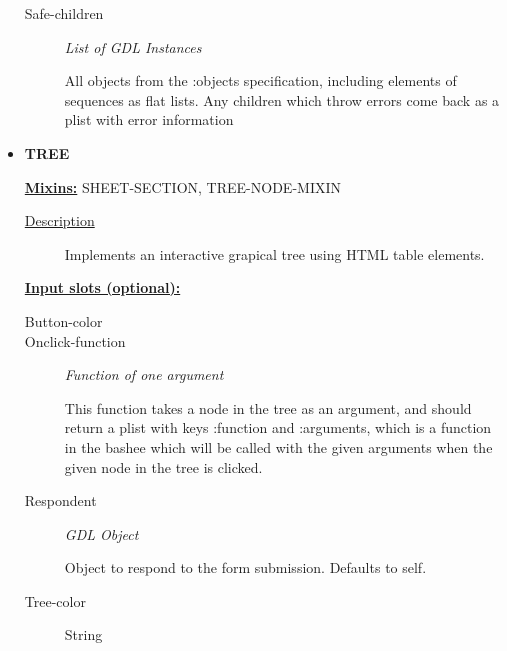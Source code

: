 \documentclass [11pt]{book}
\begin{document}
\begin{itemize}
\begin{description}
\item [Safe-children]
\emph{List of GDL Instances}

 All objects from the :objects specification, including elements of sequences
as flat lists. Any children which throw errors come back as a plist with error information




\end{description}







\item {}
\label{prim:tree}
\textbf{TREE}


\textbf{
\underline{Mixins:}} SHEET-SECTION, TREE-NODE-MIXIN





\begin{description}

\item [
\underline{Description}]


Implements an interactive grapical tree using HTML table elements.



\end{description}








\textbf{
\underline{Input slots (optional):}}

\begin{description}

\item [Button-color]





\item [Onclick-function]
\emph{Function of one argument}

 This function takes a node in the tree as an argument, and should return
a plist with keys :function and :arguments, which is a function in the bashee which will be called
with the given arguments when the given node in the tree is clicked.




\item [Respondent]
\emph{GDL Object}

 Object to respond to the form submission. Defaults to self.




\item [Tree-color]

String




\end{description}







\end{itemize}
\end{document}
